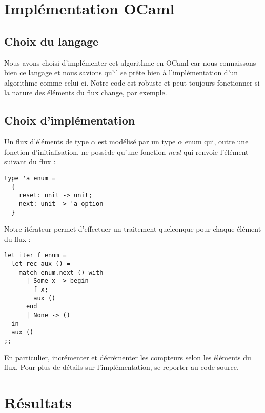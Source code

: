\documentclass{article}
\begin{document}
\section{Implémentation OCaml}
	
	\subsection{Choix du langage}
		Nous avons choisi d'implémenter cet algorithme en OCaml car nous connaissons bien ce langage et nous savions qu'il se 		prête bien à l'implémentation d'un algorithme comme celui ci. Notre code est robuste et peut toujours fonctionner si 			la nature des éléments du flux change, par exemple.
	
	\subsection{Choix d'implémentation}
		Un flux d'éléments de type $\alpha$ est modélisé par un type $\alpha$ enum qui, outre une fonction d'initialisation, 			ne possède qu'une fonction \emph{next} qui renvoie l'élément suivant du flux :
		
		\begin{lstlisting} 
type 'a enum =
  {
    reset: unit -> unit;
    next: unit -> 'a option
  }
		\end{lstlisting}
		
		Notre itérateur permet d'effectuer un traitement quelconque pour chaque élément du flux :
		
		\begin{lstlisting}
let iter f enum =
  let rec aux () =
    match enum.next () with
      | Some x -> begin
        f x;
        aux ()
      end
      | None -> ()
  in
  aux ()
;;
		\end{lstlisting}
		
		En particulier, incrémenter et décrémenter les compteurs selon les éléments du flux. 
		Pour plus de détails sur l'implémentation, se reporter au code source.
		
\section{Résultats}
\end{document}
